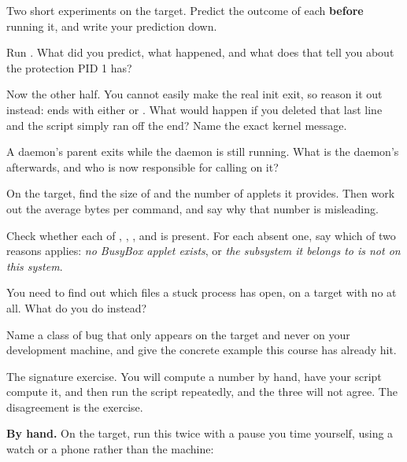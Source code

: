 Two short experiments on the target. Predict the outcome of each \textbf{before} running it, and
write your prediction down.

 Run . What did you predict, what happened, and what does that tell you
about the protection PID 1 has?

 Now the other half. You cannot easily make the real init exit, so reason it out instead:
 ends with either  or . What would
happen if you deleted that last line and the script simply ran off the end? Name the exact kernel
message.

 A daemon's parent exits while the daemon is still running. What is the daemon's
 afterwards, and who is now responsible for calling  on it?

\label{c2:ex:8}

 On the target, find the size of  and the number of applets it provides.
Then work out the average bytes per command, and say why that number is misleading.

 Check whether each of , , ,  and
 is present. For each absent one, say which of two reasons applies: \emph{no
BusyBox applet exists}, or \emph{the subsystem it belongs to is not on this system}.

 You need to find out which files a stuck process has open, on a target with no 
at all. What do you do instead?

 Name a class of bug that only appears on the target and never on your development machine,
and give the concrete example this course has already hit.

\label{c2:ex:9}

The signature exercise. You will compute a number by hand, have your script compute it, and then run
the script repeatedly, and the three will not agree. The disagreement is the exercise.

 \textbf{By hand.} On the target, run this twice with a pause you time yourself, using a
watch or a phone rather than the machine:

